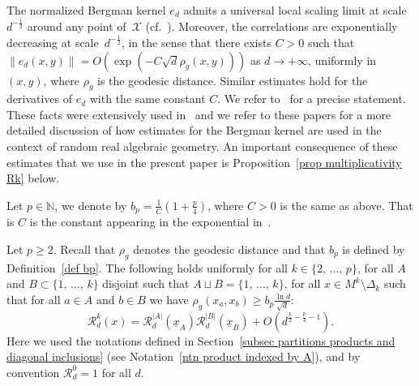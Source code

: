 \documentclass[AHL,Unicode,longabstracts,published]{cedram}
\newcommand{\X}{\mathcal{X}}
\newcommand{\clR}{\mathcal{R}}
\newcommand{\N}{\mathbb{N}}
\newcommand{\norm}[1]{\left\lvert #1 \right\rvert}
\renewcommand{\geq}{\geqslant}
\begin{document}
The normalized Bergman kernel $e_d$ admits a universal local scaling limit at scale~$d^{-\frac{1}{2}}$ around any point of~$\X$ (cf.~\cite[Theorem~4.2.1]{MM2007}). Moreover, the correlations are exponentially decreasing at scale~$d^{-\frac{1}{2}}$, in the sense that there exists $C>0$ such that $\|e_d(x,y)\| = O (\exp(-C\sqrt{d}\rho_g(x,y)))$ as $d \to +\infty$, uniformly in $(x,y)$, where $\rho_g$ is the geodesic distance. Similar estimates hold for the derivatives of $e_d$ with the same constant $C$. We refer to~\cite[Theorem~1]{MM2015} for a precise statement. These facts were extensively used in~\cite{Anc2019,Let2019,LP2019} and we refer to these papers for a more detailed discussion of how estimates for the Bergman kernel are used in the context of random real algebraic geometry. An important consequence of these estimates that we use in the present paper is Proposition~\ref{prop multiplicativity Rk} below.

\begin{defi}\label{def bp}
Let $p \in \N$, we denote by $b_p = \tfrac{1}{C}(1+\tfrac{p}{4})$, where $C>0$ is the same as above. That is $C$ is the constant appearing in the exponential in~\cite[Theorem~1, Equation~(1.3)]{MM2015}.
\end{defi}

\begin{prop}\label{prop multiplicativity Rk}
Let $p \geq 2$. Recall that $\rho_g$ denotes the geodesic distance and that $b_p$ is defined by Definition~\ref{def bp}. The following holds uniformly for all $k \in \{2,\,\dots,\,p\}$, for all $A$ and $B \subset \{1,\,\dots,\,k\}$ disjoint such that $A \sqcup B = \{1,\,\dots,\,k\}$, for all $x \in M^k \setminus \Delta_k$ such that for all $a \in A$ and $b \in B$ we have $\rho_g(x_a,x_b) \geq b_p \tfrac{\ln d}{\sqrt{d}}$:
\[
\clR^k_d(x) = \clR^{\norm{A}}_d(\underline{x}_A)\clR^{\norm{B}}_d(\underline{x}_B) + O\left(d^{\frac{k}{2}-\frac{p}{4}-1}\right).
\]
Here we used the notations defined in Section~\ref{subsec partitions products and diagonal inclusions} (see Notation~\ref{ntn product indexed by A}), and by convention $\clR_d^0=1$ for all $d$.
\end{prop}
\end{document}
